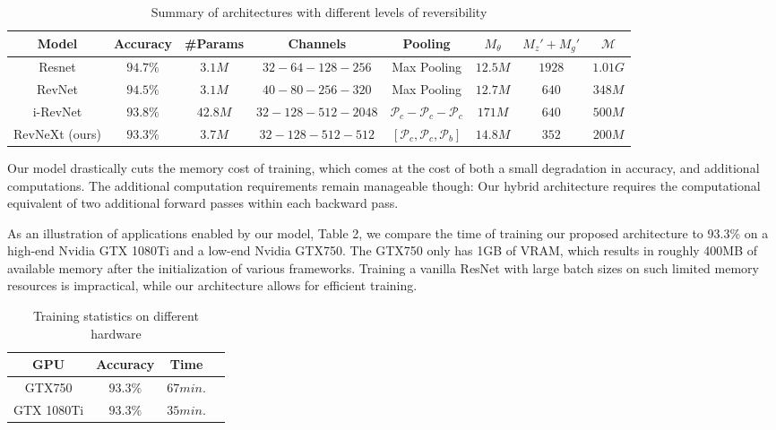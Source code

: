 \documentclass[twocolumn]{bmcart}
\begin{document}
\begin{table*}[t]
\begin{tabular}{ c c c c c c c c}
Model     & Accuracy & \#Params & Channels & Pooling  & $M_{\theta}$ & $M_{z}'+M_{g}'$ & $\mathcal{M} $ \\
\hline
Resnet              & $94.7\%$   & $3.1M$   &  $32 - 64 - 128  - 256$       & Max Pooling      				           &  $12.5M$   &  $1928$  & $1.01G$  \\
RevNet              & $94.5\%$   & $3.1M$   &  $40 - 80 - 256  - 320$       & Max Pooling      				           &  $12.7M$   &  $640$   & $348M$   \\
i-RevNet            & $93.8\%$   & $42.8M$  &  $32 - 128 - 512 - 2048$      & $\mathcal{P}_c - \mathcal{P}_c - \mathcal{P}_c$          &  $171M$    &  $640$   & $500M$   \\
RevNeXt (ours)      & $93.3\%$   & $3.7M$   &  $32 - 128 - 512 - 512$       & $[\mathcal{P}_c, \mathcal{P}_c, \mathcal{P}_b]$          &  $14.8M$   &  $352$   & $200M$   \\
\hline
\end{tabular}
\begin{center}
\caption{Summary of architectures with different levels of reversibility}
\end{center}
\end{table*}

Our model drastically cuts the memory cost of training,
which comes at the cost of both a small degradation in accuracy,
and additional computations. The additional computation requirements remain manageable though:
Our hybrid architecture requires the computational equivalent of two additional forward passes within each backward pass.

As an illustration of applications enabled by our model,
Table 2, we compare the time of training our proposed architecture
to 93.3\% on a high-end Nvidia GTX 1080Ti and a low-end Nvidia GTX750.
The GTX750 only has 1GB of VRAM, which results in roughly 400MB of available memory after the initialization of various frameworks.
Training a vanilla ResNet with large batch sizes on such limited memory resources is impractical, while our architecture allows for efficient training.

\begin{table}[h]
\centering
\begin{tabular}{ c c c c}
 GPU & Accuracy  & Time \\
\hline
GTX750     & $93.3\%$  & $67 min.$    \\
GTX 1080Ti & $93.3\%$  & $35 min.$  \\
\hline
\end{tabular}
\caption{Training statistics on different hardware}
\end{table}
\end{document}

